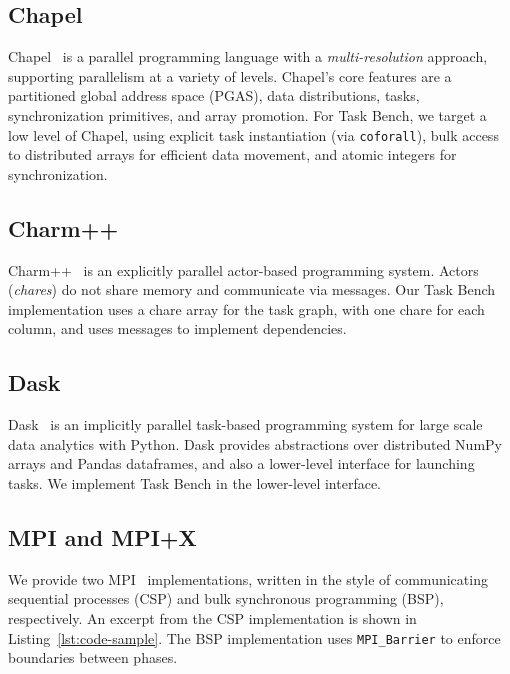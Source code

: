 \subsection{Chapel}

Chapel~\cite{Chapel15} is a parallel programming language
with a \emph{multi-res\-o\-lu\-tion} approach, supporting parallelism at a variety of
levels. Chapel's core features are a partitioned global address space
(PGAS), data distributions, tasks,
synchronization primitives, and array promotion. For Task Bench, we target a low level of
Chapel, using explicit task instantiation (via
\lstinline[language=Chapel]{coforall}), bulk access to distributed
arrays for efficient data movement, and atomic integers for
synchronization.

\subsection{Charm++}

Charm++~\cite{Charmpp93} is an explicitly parallel actor-based programming system. Actors
(\emph{chares}) do not share memory and communicate via messages. Our Task Bench implementation uses a chare
array for the task graph, with one chare for each column, and uses messages to implement dependencies.



\subsection{Dask}

Dask~\cite{Dask15} is an implicitly parallel task-based programming system for large
scale data analytics with Python. Dask provides abstractions over
distributed NumPy arrays and Pandas dataframes, and also a lower-level
interface for launching tasks. We implement Task Bench in the lower-level interface.

\subsection{MPI and MPI+X}

We provide two MPI~\cite{MPI} implementations, written in the style of
communicating sequential processes (CSP) and bulk synchronous
programming (BSP), respectively. An excerpt from the CSP
implementation is shown in Listing~\ref{lst:code-sample}. The BSP
implementation uses \lstinline[language=C++]{MPI_Barrier} to enforce
boundaries between phases.

